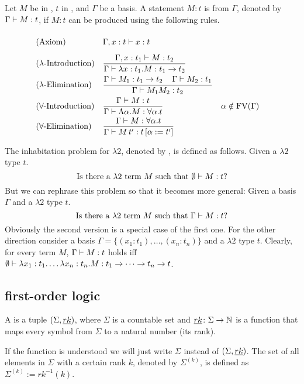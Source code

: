 \begin{definition}
Let $M$ be in \lambdaTerms{}, $t$ in \lambdaTypes, and $\Gamma$ be a basis. A statement $M:t$ is  from $\Gamma$, denoted by $\Gamma\vdash M:t$, if $M:t$ can be produced using the following rules.
\begin{mdframed} 
	\begingroup
	\addtolength{\jot}{0.3cm}
	\begin{align*}
		&(\text{Axiom}) &&\Gamma,x:t\lambdaModels x:t\vphantom{\frac{t_1}{t_1}}\\
		&(\lambda\text{-Introduction}) &&\frac{\Gamma,x:t_1\lambdaModels M:t_2}{\Gamma\lambdaModels \lambda x:t_1.M:t_1\to t_2}\\
		&(\lambda\text{-Elimination}) &&\frac{\Gamma\lambdaModels M_1:t_1\to t_2 \hspace{0.4cm}\Gamma\lambdaModels M_2:t_1}{\Gamma\lambdaModels M_1M_2:t_2}\\
& (\forall\text{-Introduction}) &   & \frac{\Gamma\lambdaModels M:t}{\Gamma\lambdaModels \Lambda\alpha.M:\forall\alpha.t}                 &   & \alpha\notin\FV(\Gamma) \\
& (\forall\text{-Elimination})  &   & \frac{\Gamma\lambdaModels M:\forall\alpha.t }{\Gamma\lambdaModels M\,t':t\left[ \alpha:=t'\right] } 
	\end{align*}
	\endgroup
\end{mdframed}
\end{definition}

\begin{definition}
The inhabitation problem for $\lambda2$, denoted by \lambdaInhab, is defined as follows. Given a $\lambda2$ type $t$.
\[\text{Is there a $\lambda2$ term $M$ such that } \emptyset\vdash M:t?\]
But we can rephrase this problem so that it becomes more general:
Given a basis $\Gamma$ and a $\lambda2$ type $t$.
\[\text{Is there a $\lambda2$ term $M$ such that } \Gamma\vdash M:t?\]
Obviously the second version is a special case of the first one. For the other direction consider a basis $\Gamma=\{(x_1:t_1),\dots,(x_n:t_n)\}$ and a $\lambda2$ type $t$. Clearly, for every term $M$, $\Gamma\vdash M:t$ holds iff $\emptyset\vdash \lambda x_1:t_1.\dots\lambda x_n:t_n.M:t_1\to\dots\to t_n\to t$.
\end{definition}
\subsection{first-order logic}
\begin{definition}
	A  is a tuple $(\Sigma,\emph{rk})$, where $\Sigma$ is a countable set and $\emph{rk}\colon\Sigma\to\mathbb{N}$ is a function that maps every symbol from $\Sigma$ to a natural number (its rank).
\end{definition}
If the function \rank{} is understood we will just write $\Sigma$ instead of $(\Sigma,\emph{rk})$. The set of all elements in $\Sigma$ with a certain rank $k$, denoted by $\Sigma^{(k)}$, is defined as $\Sigma^{(k)}:=rk^{-1}(k)$. 


